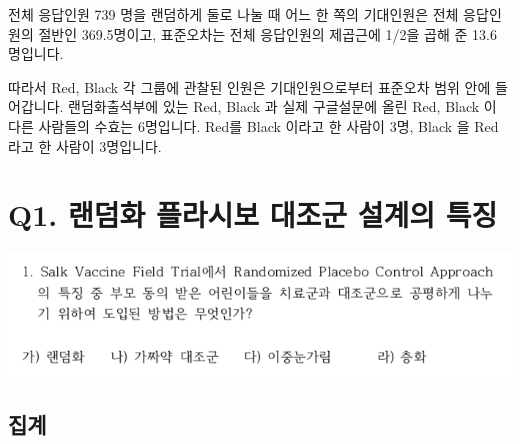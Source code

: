 \documentclass[
]{book}
\begin{document}
전체 응답인원 739 명을 랜덤하게 둘로 나눌 때 어느 한 쪽의 기대인원은 전체 응답인원의 절반인 369.5명이고, 표준오차는 전체 응답인원의 제곱근에 1/2을 곱해 준 13.6 명입니다.

따라서 Red, Black 각 그룹에 관찰된 인원은 기대인원으로부터 표준오차 범위 안에 들어갑니다.
랜덤화출석부에 있는 Red, Black 과 실제 구글설문에 올린 Red, Black 이 다른 사람들의 수효는 6명입니다. Red를 Black 이라고 한 사람이 3명, Black 을 Red 라고 한 사람이 3명입니다.

\section{Q1. 랜덤화 플라시보 대조군 설계의 특징}\label{q1.-uxb79cuxb364uxd654-uxd50cuxb77cuxc2dcuxbcf4-uxb300uxc870uxad70-uxc124uxacc4uxc758-uxd2b9uxc9d5}

\begin{flushleft}\includegraphics[width=0.75\linewidth]{./pics/Quiz180409_01} \end{flushleft}

\subsection{집계}\label{uxc9d1uxacc4-16}
\end{document}
